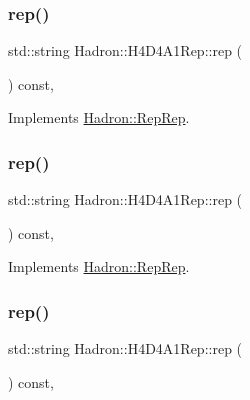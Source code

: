 \subsubsection{\texorpdfstring{rep()}{rep()}\hspace{0.1cm}{\footnotesize\ttfamily [2/5]}}
{\footnotesize\ttfamily std\+::string Hadron\+::\+H4\+D4\+A1\+Rep\+::rep (\begin{DoxyParamCaption}{ }\end{DoxyParamCaption}) const\hspace{0.3cm}{\ttfamily [inline]}, {\ttfamily [virtual]}}



Implements \mbox{\hyperlink{structHadron_1_1RepRep_ab3213025f6de249f7095892109575fde}{Hadron\+::\+Rep\+Rep}}.

\mbox{\label{structHadron_1_1H4D4A1Rep_a5b67fac5b33edc0fa72a93420b2714ca}} 
\subsubsection{\texorpdfstring{rep()}{rep()}\hspace{0.1cm}{\footnotesize\ttfamily [3/5]}}
{\footnotesize\ttfamily std\+::string Hadron\+::\+H4\+D4\+A1\+Rep\+::rep (\begin{DoxyParamCaption}{ }\end{DoxyParamCaption}) const\hspace{0.3cm}{\ttfamily [inline]}, {\ttfamily [virtual]}}



Implements \mbox{\hyperlink{structHadron_1_1RepRep_ab3213025f6de249f7095892109575fde}{Hadron\+::\+Rep\+Rep}}.

\mbox{\label{structHadron_1_1H4D4A1Rep_a5b67fac5b33edc0fa72a93420b2714ca}} 
\subsubsection{\texorpdfstring{rep()}{rep()}\hspace{0.1cm}{\footnotesize\ttfamily [4/5]}}
{\footnotesize\ttfamily std\+::string Hadron\+::\+H4\+D4\+A1\+Rep\+::rep (\begin{DoxyParamCaption}{ }\end{DoxyParamCaption}) const\hspace{0.3cm}{\ttfamily [inline]}, {\ttfamily [virtual]}}



